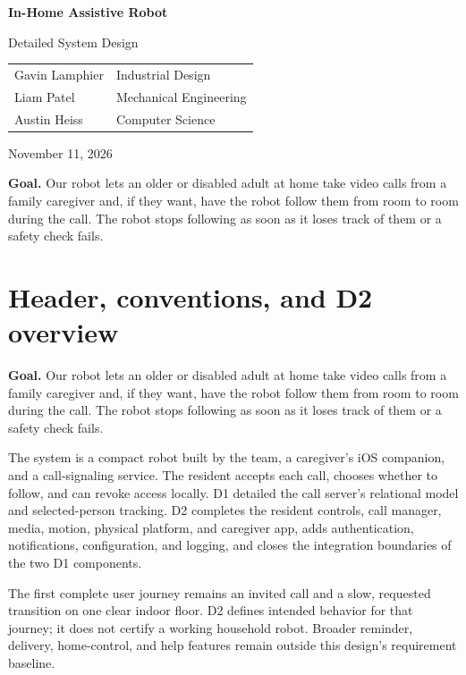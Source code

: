 \documentclass[12pt,letterpaper]{article}
\newcommand{\projectgoal}{Our robot lets an older or disabled adult at home take video calls from a family caregiver and, if they want, have the robot follow them from room to room during the call. The robot stops following as soon as it loses track of them or a safety check fails.}
\begin{document}
\begin{titlepage}\centering\vspace*{1.2in}
{\LARGE\bfseries In-Home Assistive Robot\par}\vspace{0.25in}
{\Large Detailed System Design\par}\vspace{0.12in}{\large Design D2\par}\vspace{0.8in}
\begin{tabular}{ll}Gavin Lamphier & Industrial Design\\[6pt]Liam Patel & Mechanical Engineering\\[6pt]Austin Heiss & Computer Science\end{tabular}
\par\vspace{0.55in}November 11, 2026
\vfill\begin{minipage}{0.84\textwidth}\textbf{Goal.} \projectgoal\end{minipage}
\par\vspace{0.16in}{\small AI assisted with drafting and LaTeX formatting.\par}
\par\vspace{0.16in}{\small Peer feedback recorded; follow-up validation pending.\par}\vspace*{0.6in}
\end{titlepage}

\section{Header, conventions, and D2 overview}
\textbf{Goal.} \projectgoal

The system is a compact robot built by the team, a caregiver's iOS companion, and a call-signaling service. The resident accepts each call, chooses whether to follow, and can revoke access locally. D1 detailed the call server's relational model and selected-person tracking. D2 completes the resident controls, call manager, media, motion, physical platform, and caregiver app, adds authentication, notifications, configuration, and logging, and closes the integration boundaries of the two D1 components.

The first complete user journey remains an invited call and a slow, requested transition on one clear indoor floor. D2 defines intended behavior for that journey; it does not certify a working household robot. Broader reminder, delivery, home-control, and help features remain outside this design's requirement baseline.
\end{document}
